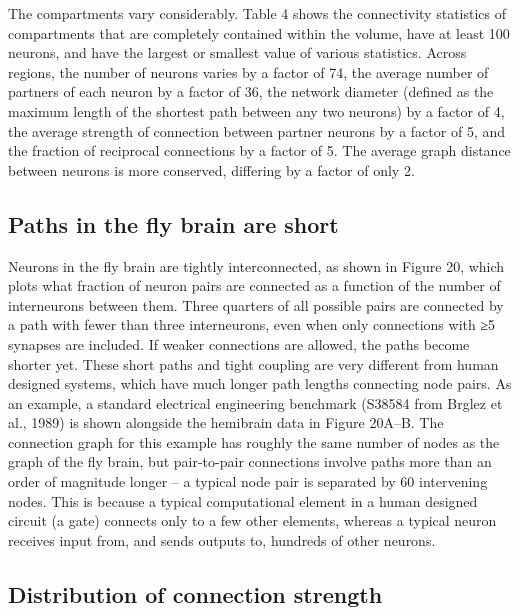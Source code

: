 \documentclass{article}
\begin{document}
The compartments vary considerably. Table 4 shows the connectivity statistics of compartments that are completely contained within the volume, have at least 100 neurons, and have the largest or smallest value of various statistics. Across regions, the number of neurons varies by a factor of 74, the average number of partners of each neuron by a factor of 36, the network diameter (defined as the maximum length of the shortest path between any two neurons) by a factor of 4, the average strength of connection between partner neurons by a factor of 5, and the fraction of reciprocal connections by a factor of 5. The average graph distance between neurons is more conserved, differing by a factor of only 2.

\subsection*{Paths in the fly brain are short}

Neurons in the fly brain are tightly interconnected, as shown in Figure 20, which plots what fraction of neuron pairs are connected as a function of the number of interneurons between them. Three quarters of all possible pairs are connected by a path with fewer than three interneurons, even when only connections with ≥5 synapses are included. If weaker connections are allowed, the paths become shorter yet. These short paths and tight coupling are very different from human designed systems, which have much longer path lengths connecting node pairs. As an example, a standard electrical engineering benchmark (S38584 from Brglez et al., 1989) is shown alongside the hemibrain data in Figure 20A–B. The connection graph for this example has roughly the same number of nodes as the graph of the fly brain, but pair-to-pair connections involve paths more than an order of magnitude longer – a typical node pair is separated by 60 intervening nodes. This is because a typical computational element in a human designed circuit (a gate) connects only to a few other elements, whereas a typical neuron receives input from, and sends outputs to, hundreds of other neurons.

\subsection*{Distribution of connection strength}
\end{document}
